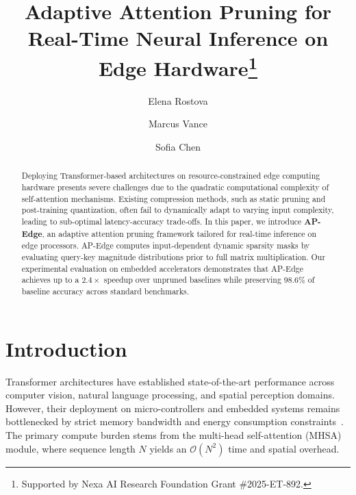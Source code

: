 \documentclass[runningheads]{llncs}
\begin{document}
\title{Adaptive Attention Pruning for Real-Time Neural Inference on Edge Hardware\thanks{Supported by Nexa AI Research Foundation Grant \#2025-ET-892.}}


\author{Elena Rostova \and
Marcus Vance \and
Sofia Chen}



\maketitle

\begin{abstract}
Deploying Transformer-based architectures on resource-constrained edge computing hardware presents severe challenges due to the quadratic computational complexity of self-attention mechanisms. Existing compression methods, such as static pruning and post-training quantization, often fail to dynamically adapt to varying input complexity, leading to sub-optimal latency-accuracy trade-offs. In this paper, we introduce \textbf{AP-Edge}, an adaptive attention pruning framework tailored for real-time inference on edge processors. AP-Edge computes input-dependent dynamic sparsity masks by evaluating query-key magnitude distributions prior to full matrix multiplication. Our experimental evaluation on embedded accelerators demonstrates that AP-Edge achieves up to a $2.4\times$ speedup over unpruned baselines while preserving $98.6\%$ of baseline accuracy across standard benchmarks.

\end{abstract}

\section{Introduction}
Transformer architectures have established state-of-the-art performance across computer vision, natural language processing, and spatial perception domains. However, their deployment on micro-controllers and embedded systems remains bottlenecked by strict memory bandwidth and energy consumption constraints~\cite{vance2024efficient}. The primary compute burden stems from the multi-head self-attention (MHSA) module, where sequence length $N$ yields an $\mathcal{O}(N^2)$ time and spatial overhead.
\end{document}
